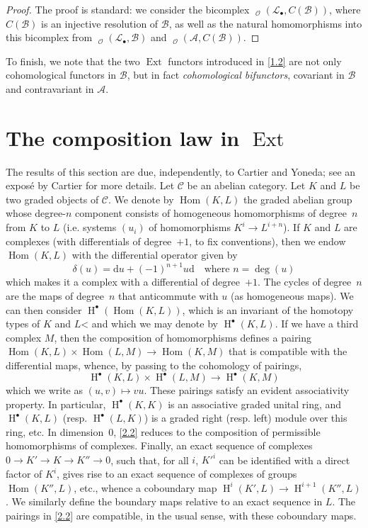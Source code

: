 \documentclass{article}
\theoremstyle{plain}
\theoremstyle{definition}
\newcommand{\sh}[1]{{\mathscr{#1}}}
\newcommand{\cat}[1]{{\mathcal{#1}}}
\DeclareMathOperator{\Ext}{Ext}
\DeclareMathOperator{\Hom}{Hom}
\DeclareMathOperator{\shHom}{\underline{Hom}}
\DeclareMathOperator{\HH}{H}
\newcommand{\oldpage}[1]{\marginpar{\footnotesize$\Big\vert$ \textit{p.~#1}}}
\begin{document}
\begin{proof}
  The proof is standard: we consider the bicomplex $\shHom_\sh{O}(\sh{L}_\bullet,C(\sh{B}))$, where $C(\sh{B})$ is an injective resolution of $\sh{B}$, as well as the natural homomorphisms into this bicomplex from $\shHom_\sh{O}(\sh{L}_\bullet,\sh{B})$ and $\shHom_\sh{O}(\sh{A},C(\sh{B}))$.
\end{proof}

To finish, we note that the two $\Ext$ functors introduced in \cref{1.2} are not only cohomological functors in $\sh{B}$, but in fact \emph{cohomological bifunctors}, covariant in $\sh{B}$ and contravariant in $\sh{A}$.


\section{The composition law in \texorpdfstring{$\Ext$}{Ext}}
\label{section2}

The results of this section are due, independently, to Cartier and Yoneda;
see an expos\'{e} by Cartier \cite{1} for more details.
Let $\cat{C}$ be an abelian category.
Let $K$ and $L$ be two graded objects of $\cat{C}$.
We denote by $\Hom(K,L)$ the graded abelian group whose degree-$n$ component consists of homogeneous homomorphisms of degree~$n$ from $K$ to $L$ (i.e. systems $(u_i)$ of homomorphisms $K^i\to L^{i+n}$).
If $K$ and $L$ are complexes (with differentials of degree~$+1$, to fix conventions), then we endow $\Hom(K,L)$ with the differential operator given by
\[
\label{2.1}
  \delta(u) = \mathrm{d}u + (-1)^{n+1}u\mathrm{d}
  \quad\text{where }n=\deg(u)
\tag{2.1}
\]
which makes it a complex with a differential of degree~$+1$.
The cycles of degree~$n$ are the maps of degree~$n$ that anticommute with $u$ (as homogeneous maps).
We can then consider $\HH^\bullet(\Hom(K,L))$, which is an invariant of the homotopy types of $K$ and $L$< and which we may denote by $\HH^\bullet(K,L)$.
If we have a third complex $M$, then the composition of homomorphisms defines a pairing $\Hom(K,L)\times\Hom(L,M)\to\Hom(K,M)$ that is compatible with the differential maps, whence, by passing to the cohomology of pairings,
\[
\label{2.2}
  \HH^\bullet(K,L)\times\HH^\bullet(L,M) \to \HH^\bullet(K,M)
\tag{2.2}
\]
which we write as $(u,v)\mapsto vu$.
These pairings satisfy an evident associativity property.
In particular, $\HH^\bullet(K,K)$ is an associative graded unital ring, and $\HH^\bullet(K,L)$ (resp. $\HH^\bullet(L,K)$) is a graded right (resp. left) module over this ring, etc.
In dimension~$0$, \cref{2.2} reduces to the composition of permissible homomorphisms of complexes.
Finally, an exact sequence of complexes
\oldpage{149-04}
$0\to K'\to K\to K''\to0$, such that, for all $i$, $K'^i$ can be identified with a direct factor of $K^i$, gives rise to an exact sequence of complexes of groups $\Hom(K'',L)$, etc., whence a coboundary map $\HH^i(K',L)\to\HH^{i+1}(K'',L)$.
We similarly define the boundary maps relative to an exact sequence in $L$.
The pairings in \cref{2.2} are compatible, in the usual sense, with these coboundary maps.
\end{document}
